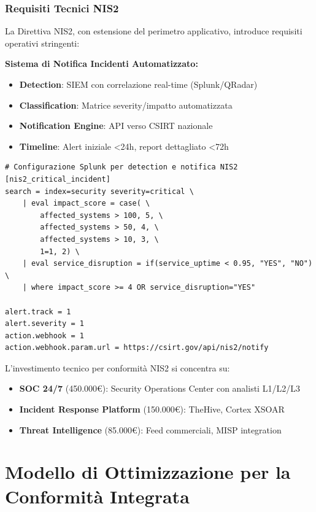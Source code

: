 \subsubsection{Requisiti Tecnici NIS2}

La Direttiva NIS2, con estensione del perimetro applicativo, introduce requisiti operativi stringenti\autocite{ENISA2024nis2}:

\textbf{Sistema di Notifica Incidenti Automatizzato:}
\begin{itemize}
    \item \textbf{Detection}: SIEM con correlazione real-time (Splunk/QRadar)
    \item \textbf{Classification}: Matrice severity/impatto automatizzata
    \item \textbf{Notification Engine}: API verso CSIRT nazionale
    \item \textbf{Timeline}: Alert iniziale <24h, report dettagliato <72h
\end{itemize}

\begin{lstlisting}[caption={Pipeline Notifica NIS2},label={lst:nis2_notification}]
# Configurazione Splunk per detection e notifica NIS2
[nis2_critical_incident]
search = index=security severity=critical \
    | eval impact_score = case( \
        affected_systems > 100, 5, \
        affected_systems > 50, 4, \
        affected_systems > 10, 3, \
        1=1, 2) \
    | eval service_disruption = if(service_uptime < 0.95, "YES", "NO") \
    | where impact_score >= 4 OR service_disruption="YES"

alert.track = 1
alert.severity = 1
action.webhook = 1
action.webhook.param.url = https://csirt.gov/api/nis2/notify
\end{lstlisting}

L'investimento tecnico per conformità NIS2 si concentra su:
\begin{itemize}
    \item \textbf{SOC 24/7} (450.000€): Security Operations Center con analisti L1/L2/L3
    \item \textbf{Incident Response Platform} (150.000€): TheHive, Cortex XSOAR
    \item \textbf{Threat Intelligence} (85.000€): Feed commerciali, MISP integration
\end{itemize}
\section{\texorpdfstring{\textbf{Modello di Ottimizzazione per la Conformità Integrata}}{4.3 - Modello di Ottimizzazione per la Conformità Integrata}}

